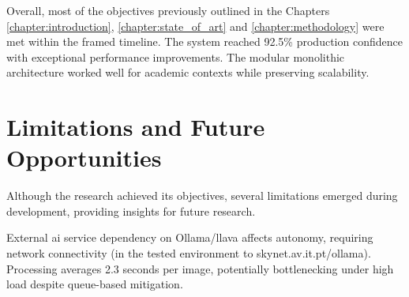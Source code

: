 Overall, most of the objectives previously outlined in the Chapters \ref{chapter:introduction}, \ref{chapter:state_of_art} and \ref{chapter:methodology} were met within the framed timeline. The system reached 92.5\% production confidence with exceptional performance improvements. The modular monolithic architecture worked well for academic contexts while preserving scalability.







\section{Limitations and Future Opportunities} \label{section:limitations_opportunities}

Although the research achieved its objectives, several limitations emerged during development, providing insights for future research.

External \ac{ai} service dependency on Ollama/\ac{llava} affects autonomy, requiring network connectivity (in the tested environment to skynet.av.it.pt/ollama). Processing averages 2.3 seconds per image, potentially bottlenecking under high load despite queue-based mitigation.

